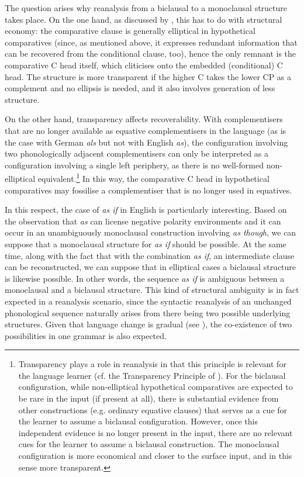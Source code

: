 The question arises why reanalysis from a biclausal to a monoclausal structure takes place. On the one hand, as discussed by \citet{bacskaiatkari2018jb}, this has to do with structural economy: the comparative clause is generally elliptical in hypothetical comparatives (since, as mentioned above, it expresses redundant information that can be recovered from the conditional clause, too), hence the only remnant is the comparative C head itself, which cliticises onto the embedded (conditional) C head. The structure is more transparent if the higher C takes the lower CP as a complement and no ellipsis is needed, and it also involves generation of less structure.

On the other hand, transparency affects recoverability. With complementisers that are no longer available as equative complementisers in the language (as is the case with German \textit{als} but not with English \textit{as}), the configuration involving two phonologically adjacent complementisers can only be interpreted as a configuration involving a single left periphery, as there is no well-formed non-elliptical equivalent.\footnote{Transparency plays a role in reanalysis in that this principle is relevant for the language learner (cf. the Transparency Principle of \citealt{lightfoot1979}). For the biclausal configuration, while non-elliptical hypothetical comparatives are expected to be rare in the input (if present at all), there is substantial evidence from other constructions (e.g. ordinary equative clauses) that serves as a cue for the learner to assume a biclausal configuration. However, once this independent evidence is no longer present in the input, there are no relevant cues for the learner to assume a biclausal construction. The monoclausal configuration is more economical and closer to the surface input, and in this sense more transparent.} In this way, the comparative C head in hypothetical comparatives may fossilise a complementiser that is no longer used in equatives.

In this respect, the case of \textit{as if} in English is particularly interesting. Based on the observation that \textit{as} can license negative polarity environments and it can occur in an unambiguously monoclausal construction involving \textit{as though}, we can suppose that a monoclausal structure for \textit{as if} should be possible. At the same time, along with the fact that with the combination \textit{as if}, an intermediate clause can be reconstructed, we can suppose that in elliptical cases a biclausal structure is likewise possible. In other words, the sequence \textit{as if} is ambiguous between a monoclausal and a biclausal structure. This kind of structural ambiguity is in fact expected in a reanalysis scenario, since the syntactic reanalysis of an unchanged phonological sequence naturally arises from there being two possible underlying structures. Given that language change is gradual (see \citealt{traugotttrousdale2010}), the co-existence of two possibilities in one grammar is also expected.


